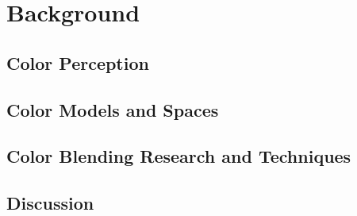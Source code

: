 
\chapter{Background}
\label{chapter:background}

\section{Color Perception}
\label{sec:colorperception}

\section{Color Models and Spaces}
\label{sec:colormodelspaces}

\section{Color Blending Research and Techniques}
\label{sec:colorblending}

\section{Discussion}
\label{sec:background_discussion}
